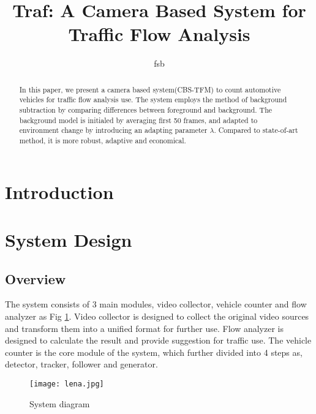 \documentclass[conference]{IEEEtran}
\begin{document}
\title{Traf: A Camera Based System for Traffic Flow Analysis}
\maketitle
\author{fsb}

\begin{abstract}

In this paper, we present a camera based system(CBS-TFM) to count automotive vehicles for traffic flow analysis use.  The system employs the method of background subtraction by comparing differences between foreground and background. The background model is initialed by averaging first 50 frames, and adapted to environment change by introducing an adapting parameter $\lambda$. Compared to state-of-art method, it is more robust, adaptive and economical.

\end{abstract}


\section{Introduction}


\section{System Design}
	\subsection{Overview}
	The system consists of 3 main modules, video collector, vehicle counter and flow analyzer as Fig \ref{sysDiagram}. Video collector is designed to collect the original video sources and transform them into a unified format for further use. Flow analyzer is designed to calculate the result and provide suggestion for traffic use. The vehicle counter is the core module of the system, which further divided into 4 steps as, detector, tracker, follower and generator. 
	
	\begin{figure}[!h]
	\texttt{[image: lena.jpg]} 
	\caption{System diagram}
	\label{sysDiagram}
	\end{figure}
	
\end{document}
